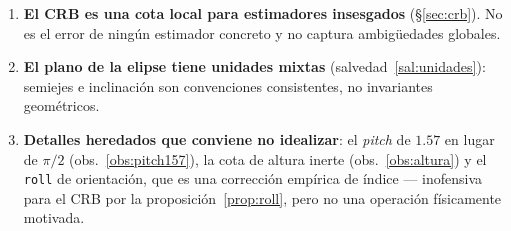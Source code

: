 \documentclass[11pt,a4paper]{article}
\newcommand{\code}[1]{\texttt{#1}}
\theoremstyle{definition}
\theoremstyle{plain}
\begin{document}
\begin{enumerate}[leftmargin=*]
        SPAD real.
  \item \textbf{El CRB es una cota local para estimadores insesgados}
        (\S\ref{sec:crb}). No es el error de ningún estimador concreto y no
        captura ambigüedades globales.
  \item \textbf{El plano de la elipse tiene unidades mixtas}
        (salvedad~\ref{sal:unidades}): semiejes e inclinación son convenciones
        consistentes, no invariantes geométricos.
  \item \textbf{Detalles heredados que conviene no idealizar}: el \emph{pitch}
        de $1.57$ en lugar de $\pi/2$ (obs.~\ref{obs:pitch157}), la cota de
        altura inerte (obs.~\ref{obs:altura}) y el \code{roll} de orientación,
        que es una corrección empírica de índice --- inofensiva para el CRB por
        la proposición~\ref{prop:roll}, pero no una operación físicamente
        motivada.
\end{enumerate}
\end{document}
